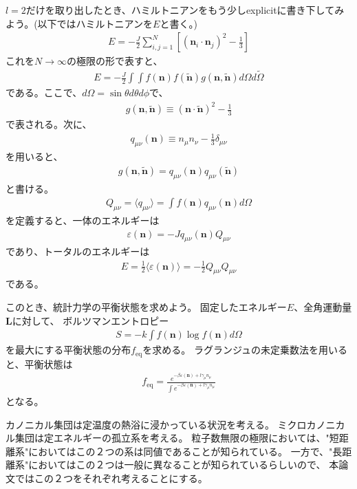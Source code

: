\documentclass[10pt, pre, twocolumn, showpacs, aps]{revtex4-1}
\begin{document}
$l=2$だけを取り出したとき、ハミルトニアンをもう少しexplicitに書き下してみよう。(以下ではハミルトニアンを$E$と書く。)
\begin{align}
E=-\frac{J}{2}\sum_{i,j=1}^{N}\left[(\pmb{n}_{i}\cdot\pmb{n}_{j})^{2}-\frac{1}{3}\right]
\end{align}
これを$N\to\infty$の極限の形で表すと、
\begin{align}
E=-\frac{J}{2}\int\int f(\pmb{n})f(\tilde{\pmb{n}})g(\pmb{n},\tilde{\pmb{n}})d\Omega d\tilde{\Omega}
\end{align}
である。ここで、$d\Omega=\sin\theta d\theta d\phi$で、
\begin{align}
g(\pmb{n},\tilde{\pmb{n}})\equiv\left(\pmb{n}\cdot\tilde{\pmb{n}}\right)^{2}-\frac{1}{3}
\end{align}
で表される。次に、
\begin{align}
q_{\mu\nu}(\pmb{n})\equiv n_{\mu}n_{\nu}-\frac{1}{3}\delta_{\mu\nu}
\end{align}
を用いると、
\begin{align}
g(\pmb{n},\tilde{\pmb{n}})=q_{\mu\nu}(\pmb{n})q_{\mu\nu}(\tilde{\pmb{n}})
\end{align}
と書ける。
\begin{align}
Q_{\mu\nu}=\langle q_{\mu\nu}\rangle
=\int f(\pmb{n})q_{\mu\nu}(\pmb{n})d\Omega
\end{align}
を定義すると、一体のエネルギーは
\begin{align}
\varepsilon(\pmb{n})
=-Jq_{\mu\nu}(\pmb{n})Q_{\mu\nu}
\end{align}
であり、トータルのエネルギーは
\begin{align}
E=\frac{1}{2}\langle\varepsilon(\pmb{n})\rangle
=-\frac{1}{2}Q_{\mu\nu}Q_{\mu\nu}
\end{align}
である。

このとき、統計力学の平衡状態を求めよう。
固定したエネルギー$E$、全角運動量$\pmb{L}$に対して、
ボルツマンエントロピー
\begin{align}
S=-k\int f(\pmb{n})\log f(\pmb{n})d\Omega
\end{align}
を最大にする平衡状態の分布$f_{\text{eq}}$を求める。
ラグランジュの未定乗数法を用いると、平衡状態は
\begin{align}
f_{\text{eq}}=\frac{e^{-\beta\varepsilon(\pmb{n})+l\gamma_{\mu}n_{\mu}}}{\int e^{-\beta\varepsilon(\pmb{n})+l\gamma_{\mu}n_{\mu}}}
\end{align}
となる。

カノニカル集団は定温度の熱浴に浸かっている状況を考える。
ミクロカノニカル集団は定エネルギーの孤立系を考える。
粒子数無限の極限においては、"短距離系"においてはこの２つの系は同値であることが知られている。
一方で、"長距離系"においてはこの２つは一般に異なることが知られているらしいので、
本論文ではこの２つをそれぞれ考えることにする。
\end{document}
